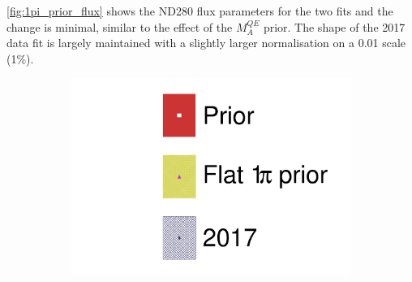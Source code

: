 \autoref{fig:1pi_prior_flux} shows the ND280 flux parameters for the two fits and the change is minimal, similar to the effect of the $M_A^{QE}$ prior. The shape of the 2017 data fit is largely maintained with a slightly larger normalisation on a 0.01 scale (1\%).
\begin{figure}[h]
	\begin{subfigure}[t]{0.1\textwidth}
		\includegraphics[width=\textwidth, trim={0mm 0mm 0mm 0mm}, clip,page=1]{figures/mach3/data/alt/2017b_FlatPion_Data_merg_2017b_NewData_NewDet_UpdXsecStep_2Xsec_4Det_5Flux_0.pdf}
	\end{subfigure}
	

\end{figure}
